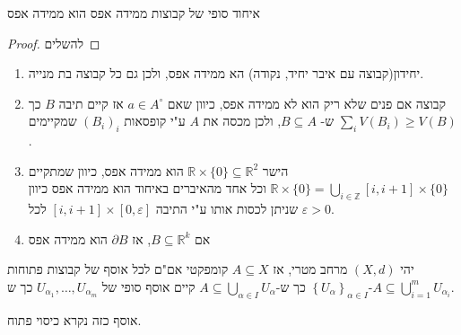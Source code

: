\documentclass{tstextbook}
\begin{document}
\begin{lemma}
איחוד סופי של קבוצות ממידה אפס הוא ממידה אפס

\end{lemma}
\begin{proof}
להשלים

\end{proof}
\begin{example}
  \begin{enumerate}
    \item יחידון(קבוצה עם איבר יחיד, נקודה) הא ממידה אפס, ולכן גם כל קבוצה בת מנייה. 


    \item קבוצה אם פנים שלא ריק הוא לא ממידה אפס, כיוון שאם \(a\in A^{\circ}\) אז קיים תיבה \(B\) כך ש- \(B\subseteq A\), ולכן מכסה את \(A\) ע"י קופסאות \((B_{i})_{i}\) שמקיימים \(\sum_{i}V(B_{i})\geq V(B)\).  


    \item הישר \(\mathbb{R}\times \{ 0 \}\subseteq \mathbb{R}^2\) הוא ממידה אפס, כיוון שמתקיים \(\mathbb{R}\times \{ 0 \}=\bigcup_{i\in\mathbb{Z}}[i,i+1]\times \{ 0 \}\) וכל אחד מהאיברים באיחוד הוא ממידה אפס כיוון שניתן לכסות אותו ע"י התיבה \([i,i+1]\times\left[ 0,\varepsilon \right]\) לכל \(\varepsilon>0\). 


    \item אם \(B\subseteq \mathbb{R}^k\), אז \(\partial B\) הוא ממידה אפס 


  \end{enumerate}
\end{example}
\begin{theorem}
יהי \((X,d)\) מרחב מטרי, אז \(A\subseteq X\) קומפקטי אם"ם לכל אוסף של קבוצות פתוחות \(\left\{  U_{\alpha}  \right\}_{\alpha \in I}\) כך ש-\(A\subseteq \bigcup_{\alpha \in I}U_{\alpha}\) קיים אוסף סופי של \(U_{\alpha_{1}},\dots,U_{\alpha_{m}}\) כך ש-\(A\subseteq \bigcup_{i=1}^mU_{\alpha_{i}}\).

\end{theorem}
אוסף כזה נקרא כיסוי פתוח.
\end{document}
